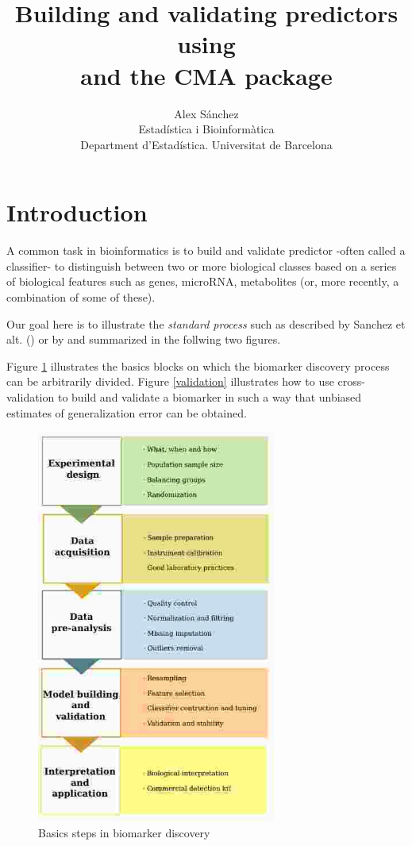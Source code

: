 \documentclass{article}\usepackage[]{graphicx}\usepackage[]{color}
\title{Building and validating predictors using \R \\ and the CMA package}
\author{Alex Sánchez\\
Estad\'istica i Bioinform\`atica\\
Department d'Estadística. Universitat de Barcelona}
\begin{document}
\maketitle

\tableofcontents






\section{Introduction}

A common task in bioinformatics is to build and validate predictor -often called a classifier- to distinguish between two or more biological classes based on a series of biological features such as genes, microRNA, metabolites (or, more recently, a combination of some of these).

Our goal here is to illustrate the \emph{standard process} such as
described by Sanchez et alt. (\cite{Sanchez2012}) or by  \cite{Dziuda2010} and summarized
 in the follwing two figures.

Figure \ref{workflow} illustrates the basics blocks on which the biomarker discovery process can be arbitrarily divided. Figure \ref{validation} illustrates how to use cross-validation to build and validate a biomarker in such a way that unbiased estimates of generalization error can be obtained.

\begin{figure}
\includegraphics[width=0.7\textwidth]{images/biomarkerDiscoveryWorkflow}
\caption{Basics steps in biomarker discovery\label{workflow}}
\end{figure}
\end{document}
